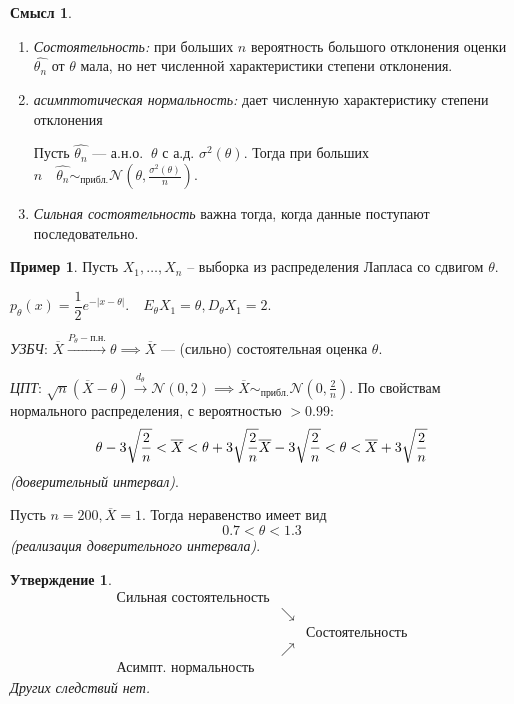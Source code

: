 \documentclass[12pt]{report}
\newtheorem{proposition}{Утверждение}
\theoremstyle{definition}
\newtheorem{example}{Пример}
\newtheorem{sense}{Смысл}
\begin{document}
\begin{sense}
	$\;$
	\begin{enumerate}
		\item \emph{Состоятельность:} при больших $n$ вероятность большого отклонения оценки $\hat{\theta_n}$ от $\theta$ мала, но нет численной характеристики степени отклонения.
		\item \emph{асимптотическая нормальность:} дает численную характеристику степени отклонения

		Пусть  $\hat{\theta_n}$ — а.н.о. $\ \theta$ с а.д. $\sigma^2(\theta)$. Тогда при больших $n\quad \hat{\theta_n} \sim_{прибл.} \mathcal{N}\left(\theta, \frac{\sigma^2(\theta)}{n}\right)$.

		\item \emph{Сильная состоятельность} важна тогда, когда данные поступают последовательно.
	\end{enumerate}
\end{sense}

\begin{example}
	Пусть $X_1, \dots, X_n$ – выборка из распределения Лапласа со сдвигом $\theta$.

$p_{\theta}(x) = \dfrac{1}{2}e^{-|x-\theta|}. \quad E_\theta X_1 = \theta, D_\theta X_1 = 2.$

\emph{УЗБЧ}: $\overline{X} \xrightarrow{P_\theta-п.н.} \theta \implies \overline{X}$ — (сильно) состоятельная оценка $\theta$.

\emph{ЦПТ}: $\sqrt{n}(\overline{X} - \theta) \xrightarrow{d_\theta} \mathcal{N}(0, 2) \implies \overline{X} \sim_{прибл.} \mathcal{N}(0, \frac{2}{n})$. По свойствам нормального распределения, с вероятностью $> 0.99$:
$$ \theta - 3\sqrt{\frac{2}{n}} < \overline{X} < \theta + 3\sqrt{\frac{2}{n}} \\ \overline{X} - 3\sqrt{\frac{2}{n}} < \theta < \overline{X} + 3\sqrt{\frac{2}{n}}$$
\emph{(доверительный интервал)}.

Пусть $n = 200, \overline{X} = 1$. Тогда неравенство имеет вид
$$ 0.7 < \theta < 1.3 $$
\emph{(реализация доверительного интервала)}.

\end{example}

\begin{proposition}
	$$ \begin{array}{ccc}
		\text{Сильная состоятельность} & & \\
		& \searrow & \\
		& &\text{Состоятельность} \\
		& \nearrow & \\
		\text{Асимпт. нормальность} & &
		\end{array} $$
		Других следствий нет.
\end{proposition}
\end{document}
